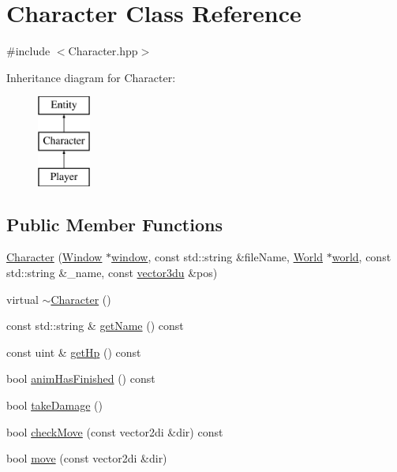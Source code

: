 \hypertarget{class_character}{}\section{Character Class Reference}
\label{class_character}


{\ttfamily \#include $<$Character.\+hpp$>$}

Inheritance diagram for Character\+:\begin{figure}[H]
\begin{center}
\leavevmode
\includegraphics[height=3.000000cm]{class_character}
\end{center}
\end{figure}
\subsection*{Public Member Functions}
\begin{DoxyCompactItemize}
\item 
\mbox{\hyperlink{class_character_a0c05e7e4b128d95737c892adb5cd7a7c}{Character}} (\mbox{\hyperlink{class_window}{Window}} $\ast$\mbox{\hyperlink{class_entity_a1f2791b6a53a16e200a687f843cee7fb}{window}}, const std\+::string \&file\+Name, \mbox{\hyperlink{class_world}{World}} $\ast$\mbox{\hyperlink{class_entity_a038b06c38fe6bb385f37c05a5647c0dc}{world}}, const std\+::string \&\+\_\+name, const \mbox{\hyperlink{_utility_8hpp_ac675fa2b6c79d0be47ae76e5d0ce38a8}{vector3du}} \&pos)
\item 
virtual \mbox{\hyperlink{class_character_a9e9be564d05ded80962b2045aa70b3fc}{$\sim$\+Character}} ()
\item 
const std\+::string \& \mbox{\hyperlink{class_character_a631dd8d1785ff701f0fc51615bb017b2}{get\+Name}} () const
\item 
const uint \& \mbox{\hyperlink{class_character_a40f5b2baaf938cfb0652d249d7b5cc21}{get\+Hp}} () const
\item 
bool \mbox{\hyperlink{class_character_a0859c556bbe019f325b2ec889331c256}{anim\+Has\+Finished}} () const
\item 
bool \mbox{\hyperlink{class_character_a1b026957e83da9071075228efd11855f}{take\+Damage}} ()
\item 
bool \mbox{\hyperlink{class_character_a21ce12e24615da73ddc5877f585cb82b}{check\+Move}} (const vector2di \&dir) const
\item 
bool \mbox{\hyperlink{class_character_af471f57bd2e938261da62ff3ea98e843}{move}} (const vector2di \&dir)
\end{DoxyCompactItemize}
